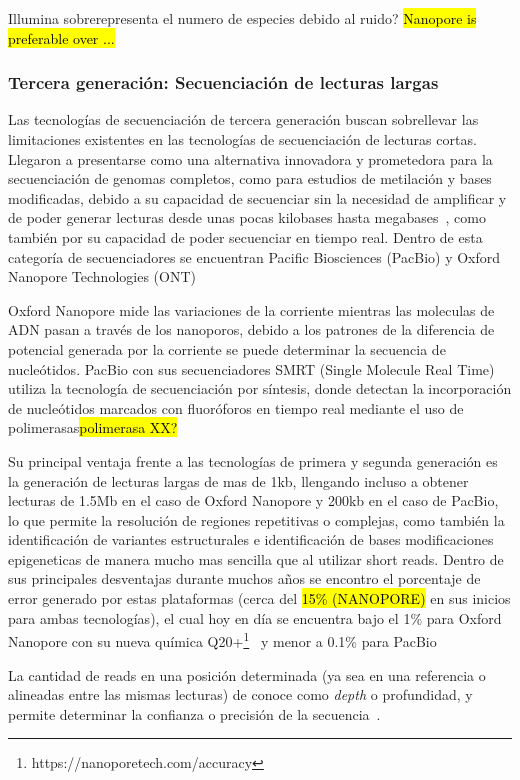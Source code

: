 Illumina sobrerepresenta el numero de especies debido al ruido? \hl{Nanopore is preferable over ...}


\subsubsection{Tercera generación: Secuenciación de lecturas largas}
Las tecnologías de secuenciación de tercera generación buscan sobrellevar las limitaciones existentes en las tecnologías de secuenciación de lecturas cortas. Llegaron a presentarse como una alternativa innovadora y prometedora para la secuenciación de genomas completos, como para estudios de metilación y bases modificadas, debido a su capacidad de secuenciar sin la necesidad de amplificar y de poder generar  lecturas desde unas pocas kilobases hasta megabases~\cite{amarasinghe2020opportunities}, como también por su capacidad de poder secuenciar en tiempo real.
Dentro de esta categoría de secuenciadores se encuentran Pacific Biosciences (PacBio) y Oxford Nanopore Technologies (ONT)

Oxford Nanopore mide las variaciones de la corriente mientras las moleculas de ADN pasan a través de los nanoporos, debido a los patrones de la diferencia de potencial generada por la corriente se puede determinar la secuencia de nucleótidos.
PacBio con sus secuenciadores SMRT (Single Molecule Real Time) utiliza la tecnología de secuenciación por síntesis, donde detectan la incorporación de nucleótidos marcados con fluoróforos en tiempo real mediante el uso de polimerasas\hl{polimerasa XX?}


Su principal ventaja frente a las tecnologías de primera y segunda generación es la generación de lecturas largas de mas de 1kb, llengando incluso a obtener lecturas de 1.5Mb en el caso de Oxford Nanopore y 200kb en el caso de PacBio, lo que permite la resolución de regiones repetitivas o complejas, como también la identificación de variantes estructurales e identificación de bases modificaciones epigeneticas de manera mucho mas sencilla que al utilizar short reads. 
Dentro de sus principales desventajas durante muchos años se encontro el porcentaje de error generado por estas plataformas (cerca del \hl{15\% (NANOPORE)} en sus inicios para ambas tecnologías), el cual hoy en día se encuentra bajo el 1\% para Oxford Nanopore con su nueva química Q20+\footnote{https://nanoporetech.com/accuracy}~\cite{cuber2023comparing} y menor a 0.1\% para PacBio~\cite{cuber2023comparing}

La cantidad de reads en una posición determinada (ya sea en una referencia o alineadas entre las mismas lecturas) de conoce como \textit{depth} o profundidad, y permite determinar la confianza o precisión de la secuencia~\cite{kumar2024next}.
